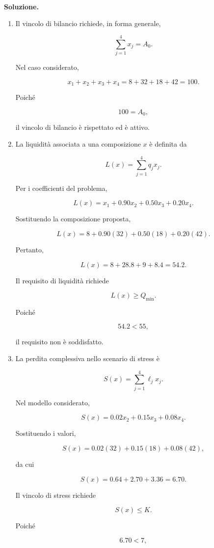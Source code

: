 \noindent
\textbf{Soluzione.}

\begin{enumerate}

\item Il vincolo di bilancio richiede, in forma generale,

\[
\sum_{j=1}^{4}x_j=A_0.
\]

Nel caso considerato,

\[
x_1+x_2+x_3+x_4
=
8+32+18+42
=
100.
\]

Poich\'e

\[
100=A_0,
\]

\noindent il vincolo di bilancio \`e rispettato ed \`e attivo.

\item La liquidit\`a associata a una composizione \(x\) \`e definita da

\[
L(x)
=
\sum_{j=1}^{4}q_jx_j.
\]

Per i coefficienti del problema,

\[
L(x)
=
x_1
+
0.90x_2
+
0.50x_3
+
0.20x_4.
\]

Sostituendo la composizione proposta,

\[
L(x)
=
8
+
0.90(32)
+
0.50(18)
+
0.20(42).
\]

Pertanto,

\[
L(x)
=
8+28.8+9+8.4
=
54.2.
\]

Il requisito di liquidit\`a richiede

\[
L(x)\geq Q_{\min}.
\]

Poich\'e

\[
54.2<55,
\]

\noindent il requisito non \`e soddisfatto.

\item La perdita complessiva nello scenario di stress \`e

\[
S(x)
=
\sum_{j=1}^{4}\ell_jx_j.
\]

Nel modello considerato,

\[
S(x)
=
0.02x_2
+
0.15x_3
+
0.08x_4.
\]

Sostituendo i valori,

\[
S(x)
=
0.02(32)
+
0.15(18)
+
0.08(42),
\]

\noindent da cui

\[
S(x)
=
0.64+2.70+3.36
=
6.70.
\]

Il vincolo di stress richiede

\[
S(x)\leq K.
\]

Poich\'e

\[
6.70<7,
\]


\end{enumerate}
